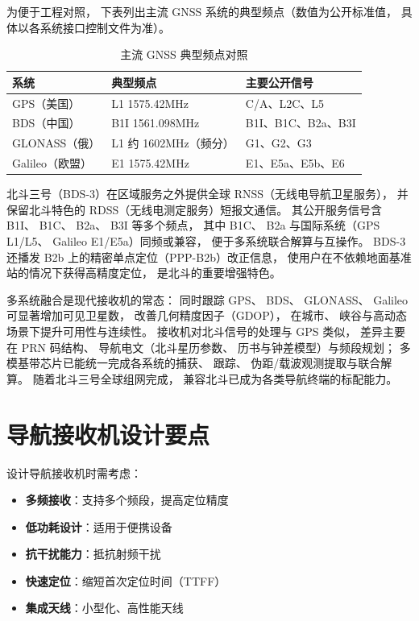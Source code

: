 为便于工程对照，
下表列出主流 GNSS 系统的典型频点（数值为公开标准值，
具体以各系统接口控制文件为准）。

\begin{table}[htbp]
\centering
\caption{主流 GNSS 典型频点对照}
\begin{tabular}{|p{4.0cm}|p{5.0cm}|p{6.0cm}|}
\hline
\textbf{系统} & \textbf{典型频点} & \textbf{主要公开信号} \\
\hline
GPS（美国） & L1 1575.42MHz & C/A、L2C、L5 \\
\hline
BDS（中国） & B1I 1561.098MHz & B1I、B1C、B2a、B3I \\
\hline
GLONASS（俄） & L1 约 1602MHz（频分） & G1、G2、G3 \\
\hline
Galileo（欧盟） & E1 1575.42MHz & E1、E5a、E5b、E6 \\
\hline
\end{tabular}
\end{table}

北斗三号（BDS-3）在区域服务之外提供全球 RNSS（无线电导航卫星服务），
并保留北斗特色的 RDSS（无线电测定服务）短报文通信。
其公开服务信号含 B1I、
B1C、
B2a、
B3I 等多个频点，
其中 B1C、
B2a 与国际系统（GPS L1/L5、
Galileo E1/E5a）同频或兼容，
便于多系统联合解算与互操作。
BDS-3 还播发 B2b 上的精密单点定位（PPP-B2b）改正信息，
使用户在不依赖地面基准站的情况下获得高精度定位，
是北斗的重要增强特色。

多系统融合是现代接收机的常态：
同时跟踪 GPS、
BDS、
GLONASS、
Galileo 可显著增加可见卫星数，
改善几何精度因子（GDOP），
在城市、
峡谷与高动态场景下提升可用性与连续性。
接收机对北斗信号的处理与 GPS 类似，
差异主要在 PRN 码结构、
导航电文（北斗星历参数、
历书与钟差模型）与频段规划；
多模基带芯片已能统一完成各系统的捕获、
跟踪、
伪距/载波观测提取与联合解算。
随着北斗三号全球组网完成，
兼容北斗已成为各类导航终端的标配能力。

\section{导航接收机设计要点}
\label{sec:nav_receiver_design}

设计导航接收机时需考虑：

\begin{itemize}
    \item \textbf{多频接收}：支持多个频段，提高定位精度
    \item \textbf{低功耗设计}：适用于便携设备
    \item \textbf{抗干扰能力}：抵抗射频干扰
    \item \textbf{快速定位}：缩短首次定位时间（TTFF）
    \item \textbf{集成天线}：小型化、高性能天线
\end{itemize}

